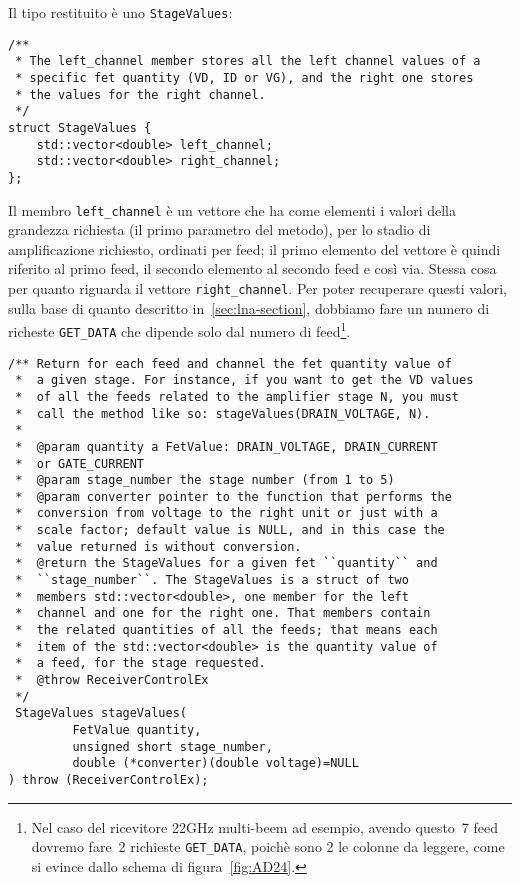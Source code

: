 Il tipo restituito \`e uno \texttt{StageValues}:
\lstset{language=C++}
\begin{lstlisting}[mathescape]
/**
 * The left_channel member stores all the left channel values of a
 * specific fet quantity (VD, ID or VG), and the right one stores 
 * the values for the right channel.
 */
struct StageValues {
    std::vector<double> left_channel;
    std::vector<double> right_channel;
};
\end{lstlisting}
\lstset{numbers=none}
Il membro \texttt{left\_channel} \`e un vettore che ha come elementi i valori della grandezza richiesta (il
primo parametro del metodo), per lo stadio di amplificazione richiesto, ordinati per feed;
il primo elemento del vettore \`e quindi riferito al primo feed, il secondo elemento al 
secondo feed e cos\`i via. Stessa cosa per quanto riguarda il vettore \texttt{right\_channel}.
Per poter recuperare questi valori, sulla base di quanto descritto in~\ref{sec:lna-section}, dobbiamo fare un 
numero di richeste \texttt{GET\_DATA} che dipende solo dal numero di feed\footnote{Nel caso del 
ricevitore 22GHz multi-beem ad esempio, avendo questo~7 feed dovremo fare~2 richieste \texttt{GET\_DATA},
poich\`e sono 2 le colonne da leggere, come si evince dallo schema di figura~\ref{fig:AD24}.}.
\lstset{language=C++}
\begin{lstlisting}[caption={Dichiarazione del metodo \texttt{stageValues}},
label=lst:stageValues,mathescape]
/** Return for each feed and channel the fet quantity value of 
 *  a given stage. For instance, if you want to get the VD values 
 *  of all the feeds related to the amplifier stage N, you must 
 *  call the method like so: stageValues(DRAIN_VOLTAGE, N).
 *
 *  @param quantity a FetValue: DRAIN_VOLTAGE, DRAIN_CURRENT 
 *  or GATE_CURRENT 
 *  @param stage_number the stage number (from 1 to 5)
 *  @param converter pointer to the function that performs the 
 *  conversion from voltage to the right unit or just with a 
 *  scale factor; default value is NULL, and in this case the 
 *  value returned is without conversion.
 *  @return the StageValues for a given fet ``quantity`` and 
 *  ``stage_number``. The StageValues is a struct of two 
 *  members std::vector<double>, one member for the left 
 *  channel and one for the right one. That members contain 
 *  the related quantities of all the feeds; that means each
 *  item of the std::vector<double> is the quantity value of 
 *  a feed, for the stage requested.
 *  @throw ReceiverControlEx
 */
 StageValues stageValues(
         FetValue quantity, 
         unsigned short stage_number, 
         double (*converter)(double voltage)=NULL
) throw (ReceiverControlEx);
\end{lstlisting}
\lstset{numbers=none}


